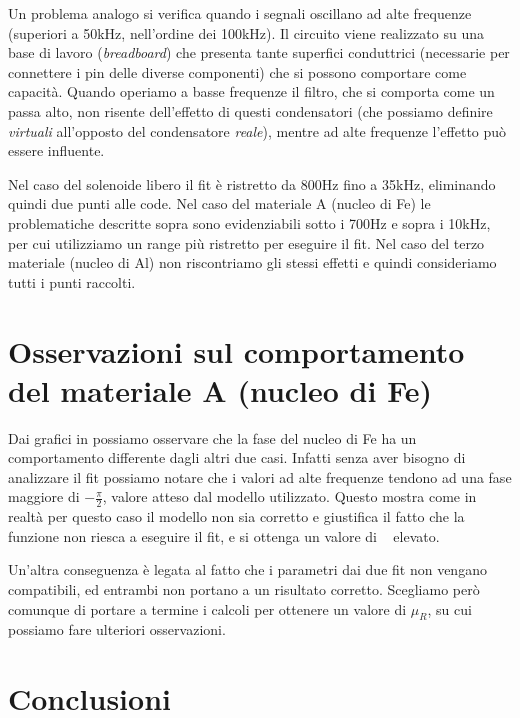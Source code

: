 \documentclass[
    rmp,
    floatfix,
    reprint, 
    superscriptaddress, 
    altaffilletter, 
    amsmath, 
    amssymb, 
    a4paper]{revtex4-2}
\begin{document}
Un problema analogo si verifica quando i segnali oscillano ad alte frequenze (superiori a 50kHz, nell'ordine dei 100kHz). Il circuito viene realizzato su una base di lavoro (\textit{breadboard}) che presenta tante superfici conduttrici (necessarie per connettere i pin delle diverse componenti) che si possono comportare come capacità. Quando operiamo a basse frequenze il filtro, che si comporta come un passa alto, non risente dell'effetto di questi condensatori (che possiamo definire \textit{virtuali} all'opposto del condensatore \textit{reale}), mentre ad alte frequenze l'effetto può essere influente. 

Nel caso del solenoide libero il fit è ristretto da 800Hz fino a 35kHz, eliminando quindi due punti alle code. Nel caso del materiale A (nucleo di Fe) le problematiche descritte sopra sono evidenziabili sotto i 700Hz e sopra i 10kHz, per cui utilizziamo un range più ristretto per eseguire il fit. Nel caso del terzo materiale (nucleo di Al) non riscontriamo gli stessi effetti e quindi consideriamo tutti i punti raccolti. 


\section*{Osservazioni sul comportamento del materiale A (nucleo di F\lowercase{e})}
Dai grafici in  possiamo osservare che la fase del nucleo di Fe ha un comportamento differente dagli altri due casi. Infatti senza aver bisogno di analizzare il fit possiamo notare che i valori ad alte frequenze tendono ad una fase maggiore di $-\frac{\pi}{2}$, valore atteso dal modello utilizzato. Questo mostra come in realtà per questo caso il modello non sia corretto e giustifica il fatto che la funzione non riesca a eseguire il fit, e si ottenga un valore di \ChiNdf~ elevato. 

Un'altra conseguenza è legata al fatto che i parametri dai due fit non vengano compatibili, ed entrambi non portano a un risultato corretto. Scegliamo però comunque di portare a termine i calcoli per ottenere un valore di $\mu_R$, su cui possiamo fare ulteriori osservazioni. 



\section*{Conclusioni}
\end{document}
